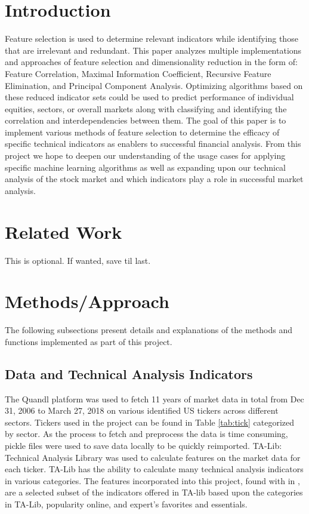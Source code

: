 \documentclass{article}\raggedbottom
\begin{document}
\section{Introduction}
	Feature selection is used to determine relevant indicators while identifying those that are irrelevant and redundant. This paper analyzes multiple implementations and approaches of feature selection and dimensionality reduction in the form of: Feature Correlation, Maximal Information Coefficient, Recursive Feature Elimination, and Principal Component Analysis. Optimizing algorithms based on these reduced indicator sets could be used to predict performance of individual equities, sectors, or overall markets along with classifying and identifying the correlation and interdependencies between them. The goal of this paper is to implement various methods of feature selection to determine the efficacy of specific technical indicators as enablers to successful financial analysis. From this project we hope to deepen our understanding of the usage cases for applying specific machine learning algorithms as well as expanding upon our technical analysis of the stock market and which indicators play a role in successful market analysis.

\section{Related Work}
This is optional. If wanted, save til last.

\section{Methods/Approach}
The following subsections present details and explanations of the methods and functions implemented as part of this project.

\subsection{Data and Technical Analysis Indicators}
The Quandl platform was used to fetch 11 years of market data in total from Dec 31, 2006 to March 27, 2018 on various identified US tickers across different sectors. Tickers used in the project can be found in Table \ref{tab:tick} categorized by sector. As the process to fetch and preprocess the data is time consuming, pickle files were used to save data locally to be quickly reimported. TA-Lib: Technical Analysis Library was used to calculate features on the market data for each ticker. TA-Lib has the ability to calculate many technical analysis indicators in various categories. The features incorporated into this project, found with in , are a selected subset of the indicators offered in TA-lib based upon the categories in TA-Lib, popularity online, and expert's favorites and essentials.
\end{document}

